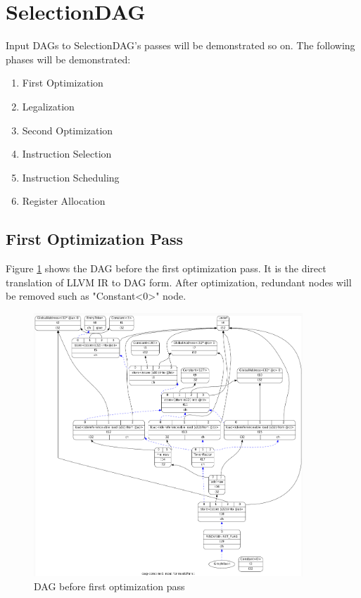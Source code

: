 \section{SelectionDAG}
 Input DAGs to SelectionDAG's passes will be demonstrated so on. The following phases will be demonstrated:
\begin{enumerate}
    \item First Optimization
    \item Legalization
    \item Second Optimization
    \item Instruction Selection
    \item Instruction Scheduling 
    \item Register Allocation
\end{enumerate}
\subsection{First Optimization Pass}
Figure \ref{fig:combine1} shows the DAG before the first optimization pass. It is the direct translation of LLVM IR to DAG form. After optimization, redundant nodes will be removed such as "Constant<0>" node.
\begin{figure}
    \centering
    \includegraphics[width=0.9\textwidth]{path_instruction/madd_dag_combine1.png}
    \caption{DAG before first optimization pass}
    \label{fig:combine1}
\end{figure}

